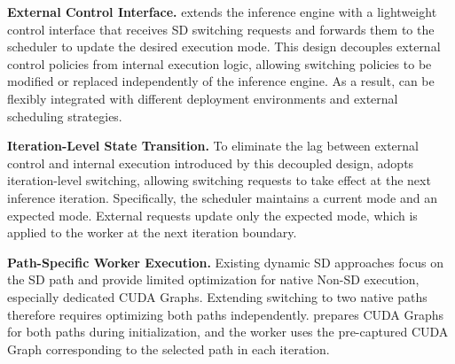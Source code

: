 \textbf{External Control Interface.}
\sysname extends the inference engine with a lightweight control interface that receives SD switching requests and forwards them to the scheduler to update the desired execution mode.
This design decouples external control policies from internal execution logic, allowing switching policies to be modified or replaced independently of the inference engine.
As a result, \sysname can be flexibly integrated with different deployment environments and external scheduling strategies.

\textbf{Iteration-Level State Transition.}
To eliminate the lag between external control and internal execution introduced by this decoupled design, \sysname adopts iteration-level switching, allowing switching requests to take effect at the next inference iteration.
Specifically, the scheduler maintains a current mode and an expected mode. External requests update only the expected mode, which is applied to the worker at the next iteration boundary.

\textbf{Path-Specific Worker Execution.}
Existing dynamic SD approaches focus on the SD path and provide limited optimization for native Non-SD execution, especially dedicated CUDA Graphs. Extending switching to two native paths therefore requires optimizing both paths independently. 
\sysname prepares CUDA Graphs for both paths during initialization, and the worker uses the pre-captured CUDA Graph corresponding to the selected path in each iteration.



